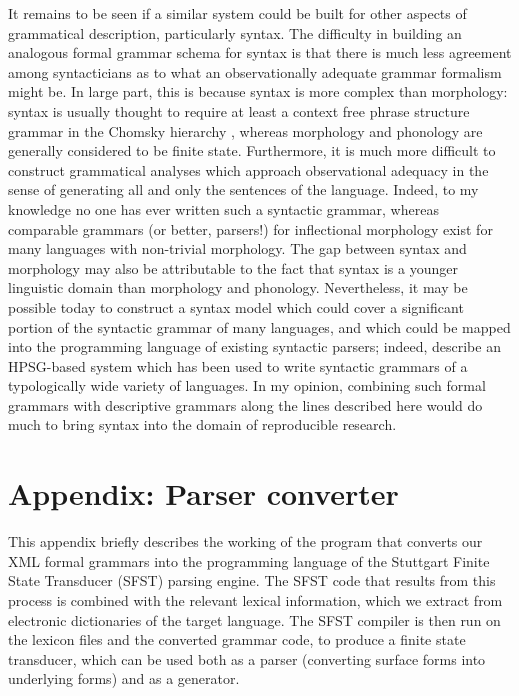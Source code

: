 It remains to be seen if a similar system could be built for other aspects of grammatical description, particularly syntax. The difficulty in building an analogous formal grammar schema for syntax is that there is much less agreement among syntacticians as to what an observationally adequate grammar formalism might be. In large part, this is because syntax is more complex than morphology: syntax is usually thought to require at least a context free phrase structure grammar in the Chomsky hierarchy \citep{Chomsky1956}, whereas morphology and phonology are generally considered to be finite state. Furthermore, it is much more difficult to construct grammatical analyses which approach observational adequacy in the sense of generating all and only the sentences of the language. Indeed, to my knowledge no one has ever written such a syntactic grammar, whereas comparable grammars (or better, parsers!) for inflectional morphology exist for many languages with non-trivial morphology. The gap between syntax and morphology may also be attributable to the fact that syntax is a younger linguistic domain than morphology and phonology. Nevertheless, it may be possible today to construct a syntax model which could cover a significant portion of the syntactic grammar of many languages, and which could be mapped into the programming language of existing syntactic parsers; indeed, \citet{BenderEtAl2010} describe an HPSG-based system which has been used to write syntactic grammars of a typologically wide variety of languages. In my opinion, combining such formal grammars with descriptive grammars along the lines described here would do much to bring syntax into the domain of reproducible research.

% 

\section{Appendix: Parser converter}

This appendix briefly describes the working of the program that converts our XML formal grammars into the programming language of the Stuttgart Finite State Transducer (SFST) parsing engine. The SFST code that results from this process is combined with the relevant lexical information, which we extract from electronic dictionaries of the target language. The SFST compiler is then run on the lexicon files and the converted grammar code, to produce a finite state transducer, which can be used both as a parser (converting surface forms into underlying forms) and as a generator. 

